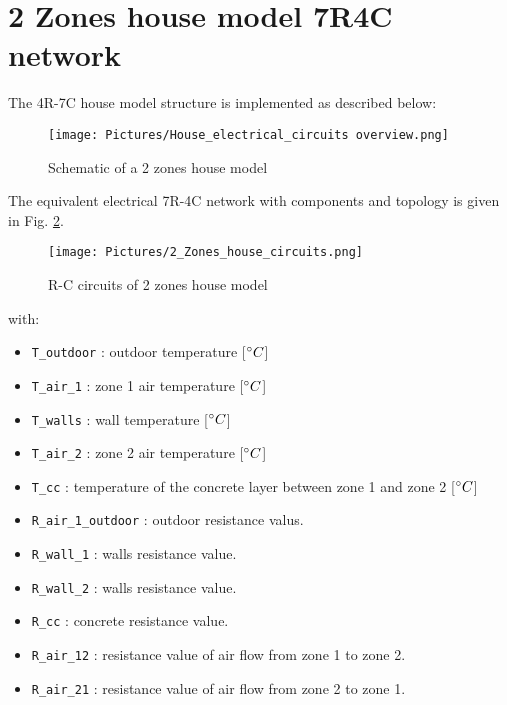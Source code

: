 \section{2 Zones house model 7R4C network}

The 4R-7C house model structure is implemented as described below:
	
\begin{figure}[H]
	\centering
	\texttt{[image: Pictures/House\_electrical\_circuits overview.png]}
	\caption[Short title]{Schematic of a 2 zones house model}
	\label{fig:schema7R4C}
	\end{figure} 
	
The equivalent electrical 7R-4C network with components and topology is given in Fig. \ref{fig:elec7R4C}.

\begin{figure}[H]
	\centering
	\texttt{[image: Pictures/2\_Zones\_house\_circuits.png]}
	\caption[Short title]{R-C circuits of 2 zones house model}
	\label{fig:elec7R4C}
	\end{figure}

with:
\begin{itemize}
    \item \texttt{T\_outdoor} : outdoor temperature [$^\circ C$] 
    \item \texttt{T\_air\_1}  : zone 1 air temperature [$^\circ C$]
    \item \texttt{T\_walls}   : wall temperature [$^\circ C$]
    \item \texttt{T\_air\_2}  : zone 2 air temperature [$^\circ C$]
    \item \texttt{T\_cc}      : temperature of the concrete layer between zone 1 and zone 2 [$^\circ C$]
    \item \texttt{R\_air\_1\_outdoor} : outdoor resistance valus.
    \item \texttt{R\_wall\_1} : walls resistance value.
    \item \texttt{R\_wall\_2} : walls resistance value.
    \item \texttt{R\_cc}      : concrete resistance value.
    \item \texttt{R\_air\_12} : resistance value of air flow from zone 1 to zone 2.
    \item \texttt{R\_air\_21} : resistance value of air flow from zone 2 to zone 1.
\end{itemize}

\newpage